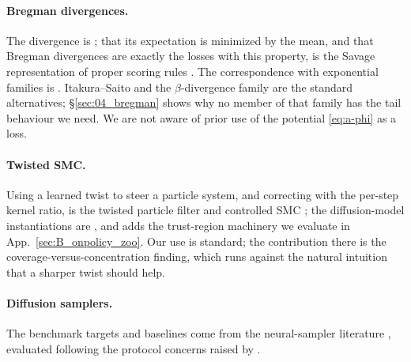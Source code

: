 \paragraph{Bregman divergences.}
The divergence is \citet{bregman1967relaxation}; that its expectation is
minimized by the mean, and that Bregman divergences are exactly the losses
with this property, is the Savage representation of proper scoring rules
\citep{savage1971elicitation,gneiting2007proper,banerjee2005clustering}. The
correspondence with exponential families is
\citet{banerjee2005clustering,azoury2001relative}. Itakura--Saito
\citep{itakura1968analysis} \citep{fevotte2009isnmf} and the $\beta$-divergence family
\citep{fevotte2011beta,cichocki2010families} are the standard
alternatives; \S\ref{sec:04_bregman} shows why no member of that family has the
tail behaviour we need. We are not aware of prior use of the potential
\eqref{eq:a-phi} as a loss.

\paragraph{Twisted SMC.}
Using a learned twist to steer a particle system, and correcting with the
per-step kernel ratio, is the twisted particle filter
\citep{whiteley2014twisted,guarniero2017iapf} and controlled SMC
\citep{heng2020csmc}; the diffusion-model instantiations are
\citet{wu2023tds,zhao2024twisted,singhal2025fksteering,skreta2025fkcorrectors},
and \citet{wang2026tritsmc} adds the trust-region machinery we evaluate in
App.~\ref{sec:B_onpolicy_zoo}. Our use is standard; the contribution there is
the coverage-versus-concentration finding, which runs against the natural
intuition that a sharper twist should help.

\paragraph{Diffusion samplers.}
The benchmark targets and baselines come from the neural-sampler literature
\citep{zhang2021pis,vargas2023dds,richter2023dis,midgley2021fab,akhoundsadegh2024idem,sendera2024offpolicy,chen2024scld},
evaluated following the protocol concerns raised by
\citet{blessing2024beyondelbos}.

